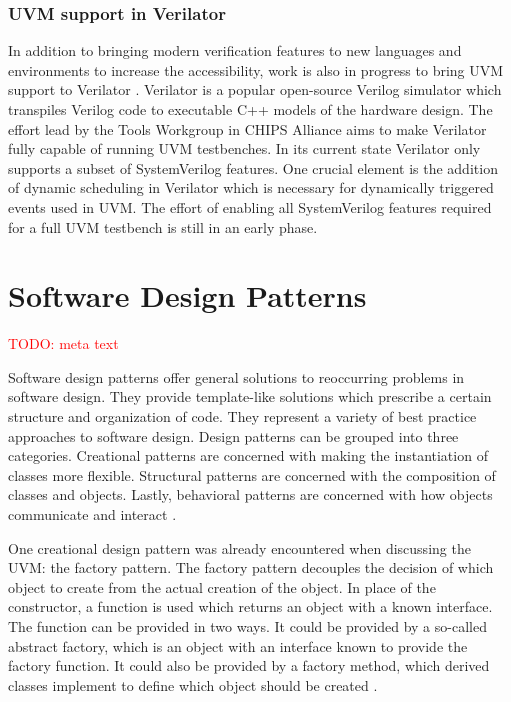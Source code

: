 \documentclass[11pt]{report}
\newcommand{\todo}[1]{\textcolor{red}{TODO: #1}}
\begin{document}
\subsubsection{UVM support in Verilator} %

In addition to bringing modern verification features to new languages and environments to increase the accessibility,
work is also in progress to bring UVM support to Verilator \cite{uvm_verilator}. Verilator is a popular open-source
Verilog simulator which transpiles Verilog code to executable C++ models of the hardware design. The effort lead by
the Tools Workgroup in CHIPS Alliance aims to make Verilator fully capable of running UVM testbenches. In its current
state Verilator only supports a subset of SystemVerilog features. One crucial element is the addition of dynamic
scheduling in Verilator which is necessary for dynamically triggered events used in UVM. The effort of enabling all
SystemVerilog features required for a full UVM testbench is still in an early phase.

\section{Software Design Patterns} %

\todo{meta text}

Software design patterns offer general solutions to reoccurring problems in software design. They provide
template-like solutions which prescribe a certain structure and organization of code. They represent a variety of
best practice approaches to software design. Design patterns can be grouped into three categories. Creational
patterns are concerned with making the instantiation of classes more flexible. Structural patterns are concerned with
the composition of classes and objects. Lastly, behavioral patterns are concerned with how objects communicate and
interact \cite[Ch. 1]{design_patterns}.

One creational design pattern was already encountered when discussing the UVM: the factory pattern. The factory
pattern decouples the decision of which object to create from the actual creation of the object. In place of the
constructor, a function is used which returns an object with a known interface. The function can be provided in two
ways. It could be provided by a so-called abstract factory, which is an object with an interface known to provide the
factory function. It could also be provided by a factory method, which derived classes implement to define which
object should be created \cite[Ch. 3]{design_patterns}.
\end{document}
